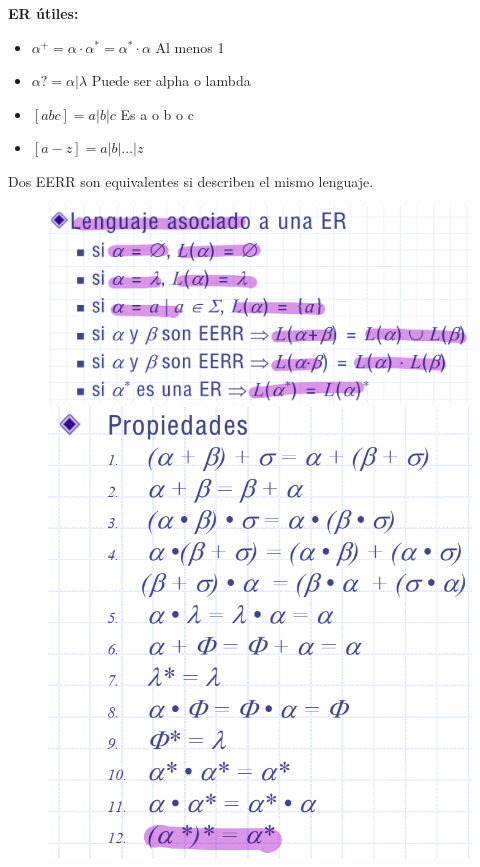 \documentclass[12pt]{report} %
\begin{document}
\textbf{ER útiles:}

\begin{itemize}
\item
  \(\alpha ^+ =\alpha \cdot \alpha ^*= \alpha ^* \cdot \alpha\) Al menos
  1
\item
  \(\alpha? = \alpha | \lambda\) Puede ser alpha o lambda
\item
  \([abc] = a|b|c\) Es a o b o c
\item
  \([a-z] = a|b|...|z\)
\end{itemize}

Dos EERR son equivalentes si describen el mismo lenguaje.

\begin{figure}[H]
	{\includegraphics[scale=.15]{Untitled 5.png}
	\includegraphics[scale=.25]{Untitled 6.png}}

\end{figure}
\end{document}
